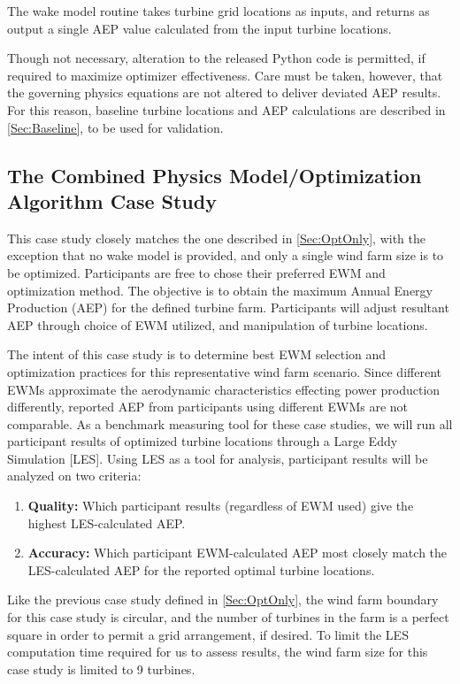 \documentclass[12pt]{article}
\begin{document}
The wake model routine takes turbine grid locations as inputs, and returns as output a single AEP value calculated from the input turbine locations.

Though not necessary, alteration to the released Python code is permitted, if required to maximize optimizer effectiveness. Care must be taken, however, that the governing physics equations are not altered to deliver deviated AEP results. For this reason, baseline turbine locations and AEP calculations are described in \cref{Sec:Baseline}, to be used for validation.

\subsection{The Combined Physics Model/Optimization Algorithm Case Study}\label{Sec:Cmbnd}
    This case study closely matches the one described in \cref{Sec:OptOnly}, with the exception that no wake model is provided, and only a single wind farm size is to be optimized. Participants are free to chose their preferred EWM and optimization method. The objective is to obtain the maximum Annual Energy Production (AEP) for the defined turbine farm. Participants will adjust resultant AEP through choice of EWM utilized, and manipulation of turbine locations.
    
    The intent of this case study is to determine best EWM selection and optimization practices for this representative wind farm scenario.  Since different EWMs approximate the aerodynamic characteristics effecting power production differently, reported AEP from participants using different EWMs are not comparable. As a benchmark measuring tool for these case studies, we will run all participant results of optimized turbine locations through a Large Eddy Simulation [LES]. Using LES as a tool for analysis, participant results will be analyzed on two criteria:
    \begin{enumerate}
        \item \textbf{Quality:} Which participant results (regardless of EWM used) give the highest LES-calculated AEP.
        \item \textbf{Accuracy:} Which participant EWM-calculated AEP most closely match the LES-calculated AEP for the reported optimal turbine locations.
    \end{enumerate}
    Like the previous case study defined in \cref{Sec:OptOnly}, the wind farm boundary for this case study is circular, and the number of turbines in the farm is a perfect square in order to permit a grid arrangement, if desired. To limit the LES computation time required for us to assess results, the wind farm size for this case study is limited to 9 turbines.
    
\end{document}
